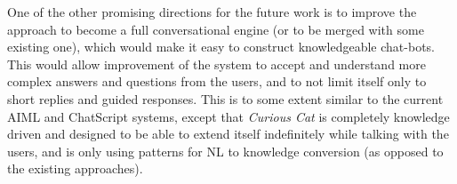 One of the other promising directions for the future work is to improve the
approach to become a full conversational engine (or to be merged with some 
existing one), which would make it easy to construct knowledgeable chat-bots. 
This would allow improvement of the system to accept and understand more 
complex answers and questions from the users, and to not limit itself only to 
short replies and guided responses. This is to some extent similar to the 
current AIML and ChatScript systems, except that \emph{Curious Cat} is 
completely knowledge driven and designed to be able to extend itself 
indefinitely while talking with the users, and is only using patterns for NL 
to knowledge conversion (as opposed to the existing approaches). 

